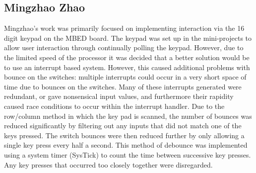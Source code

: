 \subsection*{Mingzhao Zhao}
Mingzhao's work was primarily focused on implementing interaction via 
the 16 digit keypad on the MBED board. The keypad was set up in the mini-projects 
to allow user interaction through continually polling the keypad. However, due 
to the limited speed of the processor it was decided that a better solution 
would be to use an interrupt based system.
However, this caused additional problems with bounce on the switches: 
multiple interrupts could occur in a very short space of time due to bounces on 
the switches. Many of these interrupts generated were redundant, or gave 
nonsensical input values, and furthermore their rapidity caused race conditions 
to occur within the interrupt handler. 
Due to the row/column method in which the key pad is scanned, the 
number of bounces was reduced significantly by filtering out any inputs that 
did not match one of the keys pressed. The switch bounces were then reduced 
further by only allowing a single key press every half a second. 
This method of debounce was implemented using a system 
timer (SysTick) to count the time between successive key presses. Any key 
presses that occurred too closely together were disregarded. 

